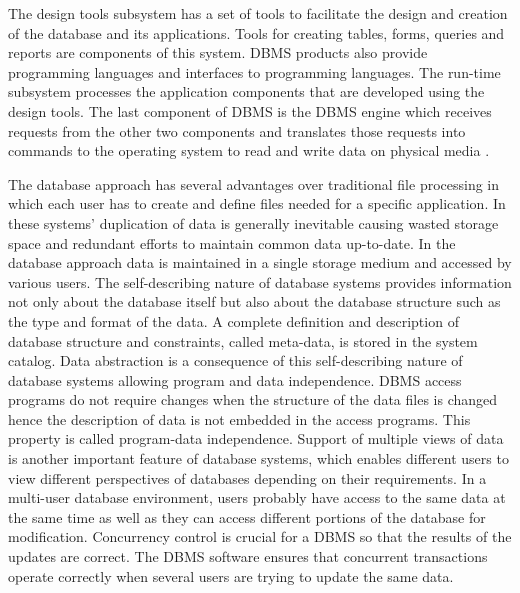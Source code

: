 The design tools subsystem has a set of tools to facilitate the design and
creation of the database and its applications. Tools for creating tables, forms,
queries and reports are components of this system. DBMS products also provide
programming languages and interfaces to programming languages. The run-time
subsystem processes the application components that are developed using the
design tools. The last component of DBMS is the DBMS engine which receives
requests from the other two components and translates those requests into
commands to the operating system to read and write data on physical media
\cite{elmasri1998}.

The database approach has several advantages over traditional file processing in
which each user has to create and define files needed for a specific
application. In these systems' duplication of data is generally inevitable
causing wasted storage space and redundant efforts to maintain common data
up-to-date. In the database approach data is maintained in a single storage
medium and accessed by various users. The self-describing nature of database
systems provides information not only about the database itself but also about
the database structure such as the type and format of the data. A complete
definition and description of database structure and constraints, called
meta-data, is stored in the system catalog. Data abstraction is a consequence of
this self-describing nature of database systems allowing program and data
independence. DBMS access programs do not require changes when the structure of
the data files is changed hence the description of data is not embedded in the
access programs. This property is called program-data independence. Support of
multiple views of data is another important feature of database systems, which
enables different users to view different perspectives of databases depending on
their requirements. In a multi-user database environment, users probably have
access to the same data at the same time as well as they can access different
portions of the database for modification. Concurrency control is crucial for a
DBMS so that the results of the updates are correct. The DBMS software ensures
that concurrent transactions operate correctly when several users are trying to
update the same data.


